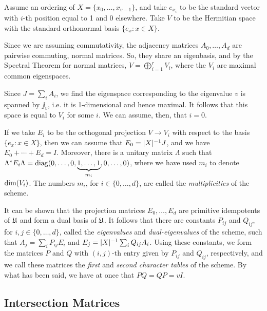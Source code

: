 \documentclass[../../../main]{subfiles}
\begin{document}
 Assume an ordering of $X=\{x_0, \dots, x_{v-1}\}$, and take $e_{x_i}$ to be the standard vector with $i$-th position equal to 1 and 0 elsewhere. Take $V$ to be the Hermitian space with the standard orthonormal basis $\{e_x : x \in X\}$. 
 
 Since we are assuming commutativity, the adjacency matrices $A_0, \dots, A_d$ are pairwise commuting, normal matrices. So, they share an eigenbasis, and by the Spectral Theorem for normal matrices, $V= \bigoplus_{i=1}^r V_i$, where the $V_i$ are maximal common eigenspaces. 
 
 Since $J=\sum_i A_i$, we find the eigenspace corresponding to the eigenvalue $v$ is spanned by $\jj_v$, i.e. it is 1-dimensional and hence maximal. It follows that this space is equal to $V_i$ for some $i$. We can assume, then, that $i=0$.
 
 If we take $E_i$ to be the orthogonal projection $V \rightarrow V_i$ with respect to the basis $\{e_x : x \in X\}$, then we can assume that $E_0=|X|^{-1}J$, and we have $E_0 + \cdots + E_d = I$. Moreover, there is a unitary matrix $\Lambda$ such that $\Lambda^* E_i \Lambda = \text{diag}(0,\dots,0,\underbrace{1,\dots,1}_{m_i},0,\dots,0)$, where we have used $m_i$ to denote $\text{dim}(V_i)$. The numbers $m_i$, for $i \in \{0, \dots, d\}$, are called the {\it multiplicities} of the scheme.
 
 It can be shown \cite[see][Theorem 3.1]{bannaialgebraic} that the projection matrices $E_0, \dots, E_d$ are primitive idempotents of $\mathfrak{U}$ and form a dual basis of $\mathfrak{U}$. It follows that there are constants $P_{ij}$ and $Q_{ij}$, for $i,j \in \{0, \dots, d\}$, called the {\it eigenvalues} and {\it dual-eigenvalues} of the scheme, such that $A_j=\sum_i P_{ij}E_i$ and $E_j=|X|^{-1}\sum_i Q_{ij}A_i$. Using these constants, we form the matrices $P$ and $Q$ with $(i,j)$-th entry given by $P_{ij}$ and $Q_{ij}$, respectively, and we call these matrices the {\it first} and {\it second character tables} of the scheme. By what has been said, we have at once that $PQ=QP=vI$.
 
 \dinkus

 
  \subsection{Intersection Matrices}
 
\end{document}
